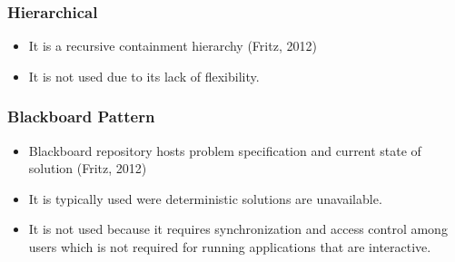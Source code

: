 \documentclass[a4paper,12pt]{article}
\begin{document}
\subsubsection{Hierarchical}
\begin{itemize}
\item It is a recursive containment hierarchy (Fritz, 2012)
\item It is not used due to its lack of flexibility.
\end{itemize}

\subsubsection{Blackboard Pattern}
\begin{itemize}
\item Blackboard repository hosts problem specification and current state of solution (Fritz, 2012)
\item It is typically used were deterministic solutions are unavailable.
\item It is not used because it requires synchronization and access control among users which is not required for running applications that are interactive.
\end{itemize}
\end{document}
